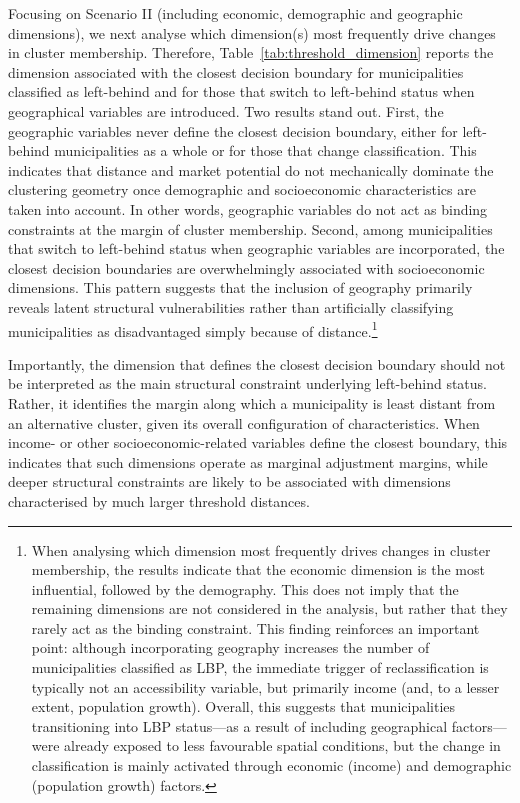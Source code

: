 \documentclass[a4paper,11pt,oneside]{article}
\begin{document}
Focusing on Scenario II (including economic, demographic and geographic dimensions), we next analyse which dimension(s) most frequently drive changes in cluster membership. Therefore, Table~\ref{tab:threshold_dimension} reports the dimension associated with the closest decision boundary for municipalities classified as left-behind and for those that switch to left-behind status when geographical variables are introduced. Two results stand out. First, the geographic variables never define the closest decision boundary, either for left-behind municipalities as a whole or for those that change classification. This indicates that distance and market potential do not mechanically dominate the clustering geometry once demographic and socioeconomic characteristics are taken into account. In other words, geographic variables do not act as binding constraints at the margin of cluster membership. Second, among municipalities that switch to left-behind status when geographic variables are incorporated, the closest decision boundaries are overwhelmingly associated with socioeconomic dimensions. This pattern suggests that the inclusion of geography primarily reveals latent structural vulnerabilities
rather than artificially classifying municipalities as disadvantaged simply because of distance.\footnote{When analysing which dimension most frequently drives changes in cluster membership, the results indicate that the economic dimension is the most influential, followed by the demography. This does not imply that the remaining dimensions are not considered in the analysis, but rather that they rarely act as the binding constraint. This finding reinforces an important point: although incorporating geography increases the number of municipalities classified as LBP, the immediate trigger of reclassification is typically not an accessibility variable, but primarily income (and, to a lesser extent, population growth). Overall, this suggests that municipalities transitioning into LBP status—as a result of including geographical factors—were already exposed to less favourable spatial conditions, but the change in classification is mainly activated through economic (income) and demographic (population growth) factors.}

Importantly, the dimension that defines the closest decision boundary should not be interpreted as the main structural constraint underlying left-behind status. Rather, it identifies the margin along which a municipality is least distant from an alternative cluster, given its overall configuration of characteristics. When income- or other socioeconomic-related variables define the closest boundary, this indicates that such dimensions operate as marginal adjustment margins, while deeper structural constraints are likely to be associated with dimensions characterised by much larger threshold distances.
\end{document}
